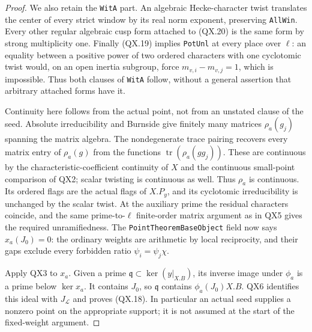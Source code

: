 \begin{proof}
We also retain the \texttt{WitA} part.  An algebraic
Hecke-character twist translates the center of every
strict window by its real norm exponent, preserving
\texttt{AllWin}.  Every other regular algebraic cusp
form attached to (QX.20) is the same form by strong
multiplicity one.  Finally (QX.19) implies
\texttt{PotUnl} at every place over $\ell$: an equality
between a positive power of two ordered characters
with one cyclotomic twist would, on an open inertia
subgroup, force $m_{v,i}-m_{v,j}=1$, which is impossible.
Thus both clauses of \texttt{WitA} follow, without a
general assertion that arbitrary attached forms have it.

Continuity here follows from the actual point, not from an
unstated clause of the seed.  Absolute irreducibility and
Burnside give finitely many matrices $\rho_a(g_j)$ spanning
the matrix algebra.  The nondegenerate trace pairing recovers
every matrix entry of $\rho_a(g)$ from the functions
$\operatorname{tr}(\rho_a(gg_j))$.  These are continuous
by the characteristic-coefficient continuity of $X$ and
the continuous small-point comparison of QX2; scalar
twisting is continuous as well.  Thus $\rho_a$ is continuous.
Its ordered flags are the actual
flags of $X.P_y$, and its cyclotomic irreducibility is
unchanged by the scalar twist.  At the auxiliary prime
the residual characters coincide, and the same
prime-to-$\ell$ finite-order matrix argument as in QX5
gives the required unramifiedness.  The
\texttt{PointTheoremBaseObject} field now says
$x_a(J_0)=0$: the ordinary weights are arithmetic by
local reciprocity, and their gaps exclude every forbidden
ratio $\psi_i=\psi_j\chi$.

Apply QX3 to $x_a$.  Given a prime
$\mathfrak q\subset\ker(y|_{X.B})$, its inverse image
under $\phi_a$ is a prime below $\ker x_a$.
It contains $J_0$, so $\mathfrak q$ contains
$\phi_a(J_0)X.B$.  QX6 identifies this ideal with
$J_{\mathcal L}$ and proves (QX.18).
In particular an actual seed supplies a nonzero point
on the appropriate support; it is not assumed at the
start of the fixed-weight argument.
\end{proof}

